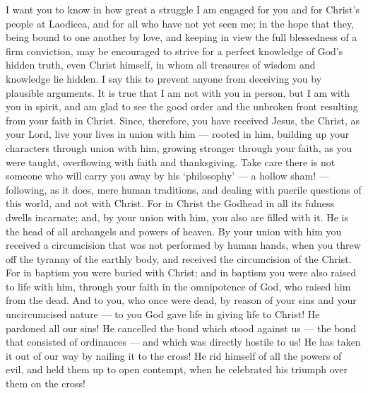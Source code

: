  I want you to know in how great a struggle I am engaged for
you and for Christ's people at Laodicea, and for all who have not yet
seen me;  in the hope that they, being bound to one another
by love, and keeping in view the full blessedness of a firm conviction,
may be encouraged to strive for a perfect knowledge of God's hidden
truth,  even Christ himself, in whom all treasures of wisdom
and knowledge lie hidden.  I say this to prevent anyone from
deceiving you by plausible arguments.  It is true that I am
not with you in person, but I am with you in spirit, and am glad to see
the good order and the unbroken front resulting from your faith in
Christ.  Since, therefore, you have received Jesus, the
Christ, as your Lord, live your lives in union with him --- 
rooted in him, building up your characters through union with him,
growing stronger through your faith, as you were taught, overflowing
with faith and thanksgiving.  Take care there is not someone
who will carry you away by his `philosophy' --- a hollow sham! ---
following, as it does, mere human traditions, and dealing with puerile
questions of this world, and not with Christ.  For in Christ
the Godhead in all its fulness dwells incarnate;  and, by
your union with him, you also are filled with it. He is the head of all
archangels and powers of heaven.  By your union with him
you received a circumcision that was not performed by human hands, when
you threw off the tyranny of the earthly body, and received the
circumcision of the Christ.  For in baptism you were buried
with Christ; and in baptism you were also raised to life with him,
through your faith in the omnipotence of God, who raised him from the
dead.  And to you, who once were dead, by reason of your
sins and your uncircumcised nature --- to you God gave life in giving
life to Christ! He pardoned all our sins!  He cancelled the
bond which stood against us --- the bond that consisted of ordinances
--- and which was directly hostile to us! He has taken it out of our way
by nailing it to the cross!  He rid himself of all the
powers of evil, and held them up to open contempt, when he celebrated
his triumph over them on the cross!

